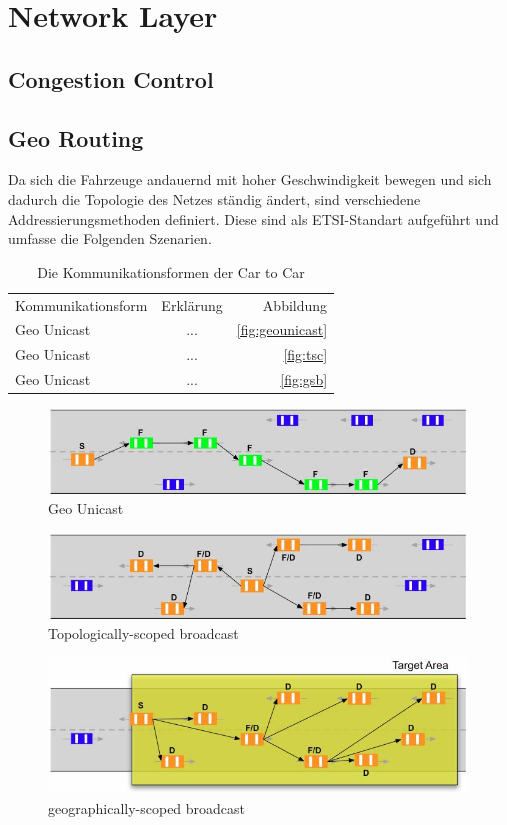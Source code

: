 \chapter{Network Layer\label{chap:networklayer}}
\section{Congestion Control\label{sec:congestioncontrol}}
\section{Geo Routing\label{sec:georouting}}
Da sich die Fahrzeuge andauernd mit hoher Geschwindigkeit bewegen und sich dadurch die Topologie des Netzes ständig ändert, sind verschiedene Addressierungsmethoden definiert. Diese sind als ETSI-Standart aufgeführt und umfasse die Folgenden Szenarien. 
\begin{table}[h]
 \caption{Die Kommunikationsformen der Car to Car}
\begin{tabular}{lcr}
  Kommunikationsform  & Erklärung & Abbildung \\
  Geo Unicast & ... & \autoref{fig:geounicast} \\
  Geo Unicast & ... & \autoref{fig:tsc} \\
  Geo Unicast & ... & \autoref{fig:gsb} \\
\end{tabular}
\end{table}

  
\begin{figure}
\includegraphics[width=0.99\textwidth]{content/images/03_networklayer/GeoUnicast.jpg}
\caption{Geo Unicast \cite{etsi102636-1}}
\label{fig:geounicast}
\end{figure}

\begin{figure}
\includegraphics[width=0.99\textwidth]{content/images/03_networklayer/TSC.jpg}
\caption{Topologically-scoped broadcast \cite{etsi102636-1}}
\label{fig:tsc}
\end{figure}

\begin{figure}
\includegraphics[width=0.99\textwidth]{content/images/03_networklayer/GSB.jpg}
\caption{geographically-scoped broadcast \cite{etsi102636-1}}
\label{fig:gsb}
\end{figure}
